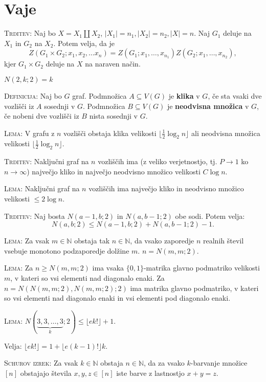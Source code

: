 \documentclass[8pt,a4paper]{amsart}
\theoremstyle{definition} %
\theoremstyle{plain} %
\newcommand{\N}{\mathbb N}
\begin{document}
\section{Vaje}

\textsc{Trditev:} Naj bo $X = X_1  \amalg X_2 $, $|X_1|=n_1, |X_2|=n_2,|X|=n$.
Naj $G_1$ deluje na $X_1$ in $G_2$ na $X_2$. Potem velja, da je
$$ Z(G_1 \times G_2 ;x_1,x_2,\ldots x_n) = Z(G_1;x_1,\ldots ,x_{n_1}) Z(G_2 ;x_1,\ldots , x_{n_2}),$$
kjer $G_1 \times G_2$ deluje na $X$ na naraven način.

$N(2,k;2)=k$

\textsc{Definicija:} Naj bo $G$ graf. Podmnožica $A \subseteq V(G)$ je
\textbf{klika} v $G$, če sta vsaki dve vozlišči iz $A$ sosednji v $G$.
Podmnožica $B \subseteq V(G)$ je \textbf{neodvisna množica} v $G$, če nobeni dve
vozlišči iz $B$ nista sosednji v $G$.

\textsc{Lema:} V grafu z $n$ vozlišči obstaja klika velikosti $\lfloor
\frac{1}{2}\log_2{n}\rfloor$ ali neodvisna množica velikosti $\lfloor
\frac{1}{2}\log_2{n}\rfloor$.

\textsc{Trditev:} Naključni graf na $n$ vozliščih ima (z veliko verjetnostjo,
tj. $P\to1$ ko $n\to\infty$) največjo kliko in največjo
neodvisno množico velikosti $C\log{n}$.

\textsc{Lema:} Naključni graf na $n$ vozliščih ima največjo kliko in neodvisno
množico velikosti $\leq 2\log{n}$.

\textsc{Trditev:} Naj bosta $N(a-1,b;2)$ in $N(a,b-1;2)$ obe sodi. Potem velja:
$$ N(a,b;2) \leq N(a-1,b;2) + N(a,b-1;2) - 1.$$

\textsc{Lema:} Za vsak $m \in \N$ obstaja tak $n \in \N$, da vsako zaporedje
 $n$ realnih števil vsebuje monotono podzaporedje dolžine $m$. $n = N(m,m;2)$.

\textsc{Lema:} Za $n \geq N(m,m;2)$ ima vsaka $\{ 0,1 \}$-matrika glavno
podmatriko velikosti $m$, v kateri so vsi elementi nad diagonalo enaki. Za $n =
N(N(m,m;2),N(m,m;2);2)$ ima matrika glavno podmatriko, v kateri so vsi elementi
nad diagonalo enaki in vsi elementi pod diagonalo enaki.

\textsc{Lema:} $N(\underbrace{3,3,\ldots ,3}_k;2) \leq \lfloor e k! \rfloor + 1$.

Velja: $\lfloor ek! \rfloor = 1 + \lfloor e(k-1)! \rfloor k$.

\textsc{Schurov izrek:} Za vsak $k \in \N$ obstaja $n \in \N$, da za vsako
$k$-barvanje množice $[n]$ obstajajo števila $x,y,z \in [n]$ iste barve z
lastnostjo $x+y=z$.
\end{document}
